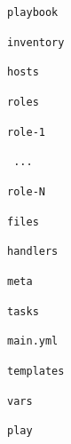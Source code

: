 \documentclass[11pt]{article}
\begin{document}
\begin{flushleft}
\begin{minipage}{.6\textwidth}
    \end{minipage}%
    \hspace{1.5cm}
    \begin{minipage}{.3\textwidth}
        \footnotesize
        
        \texttt{playbook} 
        
            \hspace{.5cm}
            \texttt{inventory} 
        
                \hspace{1cm}
                \texttt{hosts}
        
            \hspace{.5cm}
            \texttt{roles}
        
                \hspace{1cm}
                \texttt{role-1}
            
                \hspace{1cm}
                \texttt{ ... }
        
                \hspace{1cm}
                \texttt{role-N}
        
                    \hspace{1.5cm}
                    \texttt{files}
    
                    \hspace{1.5cm}
                    \texttt{handlers}
    
                    \hspace{1.5cm}
                    \texttt{meta}
    
                    \hspace{1.5cm}
                    \texttt{tasks}
    
                        \hspace{2cm}
                        \texttt{main.yml}    
    
                    \hspace{1.5cm}
                    \texttt{templates}
    
                    \hspace{1.5cm}
                    \texttt{vars}                
                    
            \hspace{.5cm}
            \texttt{play} 
    
        \label{arbol_ansible}
    \end{minipage}



\end{flushleft}
\end{document}
